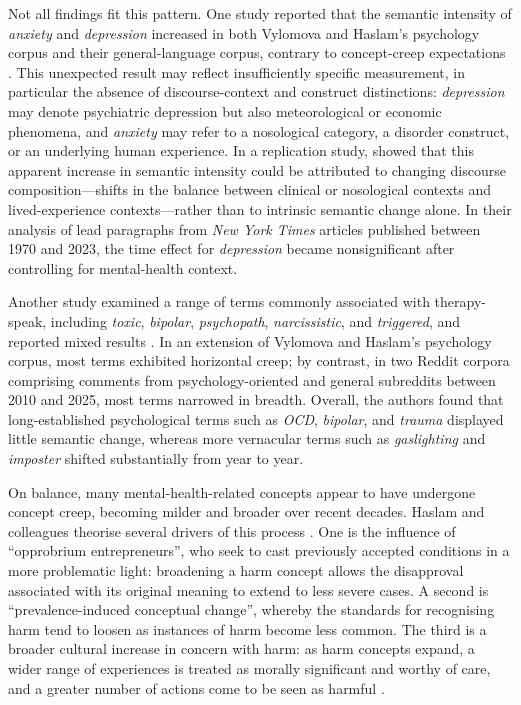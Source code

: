 Not all findings fit this pattern. One study reported that the semantic intensity of \textit{anxiety} and \textit{depression} increased in both Vylomova and Haslam's psychology corpus and their general-language corpus, contrary to concept-creep expectations \citep{xiaoHaveConceptsAnxiety2023}. This unexpected result may reflect insufficiently specific measurement, in particular the absence of discourse-context and construct distinctions: \textit{depression} may denote psychiatric depression but also meteorological or economic phenomena, and \textit{anxiety} may refer to a nosological category, a disorder construct, or an underlying human experience. In a replication study, \citet{pislRevisitingSemanticSeverity2025} showed that this apparent increase in semantic intensity could be attributed to changing discourse composition---shifts in the balance between clinical or nosological contexts and lived-experience contexts---rather than to intrinsic semantic change alone. In their analysis of lead paragraphs from \textit{New York Times} articles published between 1970 and 2023, the time effect for \textit{depression} became nonsignificant after controlling for mental-health context.

Another study examined a range of terms commonly associated with therapy-speak, including \textit{toxic}, \textit{bipolar}, \textit{psychopath}, \textit{narcissistic}, and \textit{triggered}, and reported mixed results \citep{iacobComputationalAnalysisEmergence2026}. In an extension of Vylomova and Haslam's psychology corpus, most terms exhibited horizontal creep; by contrast, in two Reddit corpora comprising comments from psychology-oriented and general subreddits between 2010 and 2025, most terms narrowed in breadth. Overall, the authors found that long-established psychological terms such as \textit{OCD}, \textit{bipolar}, and \textit{trauma} displayed little semantic change, whereas more vernacular terms such as \textit{gaslighting} and \textit{imposter} shifted substantially from year to year.

On balance, many mental-health-related concepts appear to have undergone concept creep, becoming milder and broader over recent decades. Haslam and colleagues theorise several drivers of this process \citep{haslamHarmInflationMaking2020,haslamConceptCreepMental2026}. One is the influence of ``opprobrium entrepreneurs'', who seek to cast previously accepted conditions in a more problematic light: broadening a harm concept allows the disapproval associated with its original meaning to extend to less severe cases. A second is ``prevalence-induced conceptual change'', whereby the standards for recognising harm tend to loosen as instances of harm become less common. The third is a broader cultural increase in concern with harm: as harm concepts expand, a wider range of experiences is treated as morally significant and worthy of care, and a greater number of actions come to be seen as harmful \citep{haslamHarmInflationMaking2020,haslamConceptCreepMental2026}.

